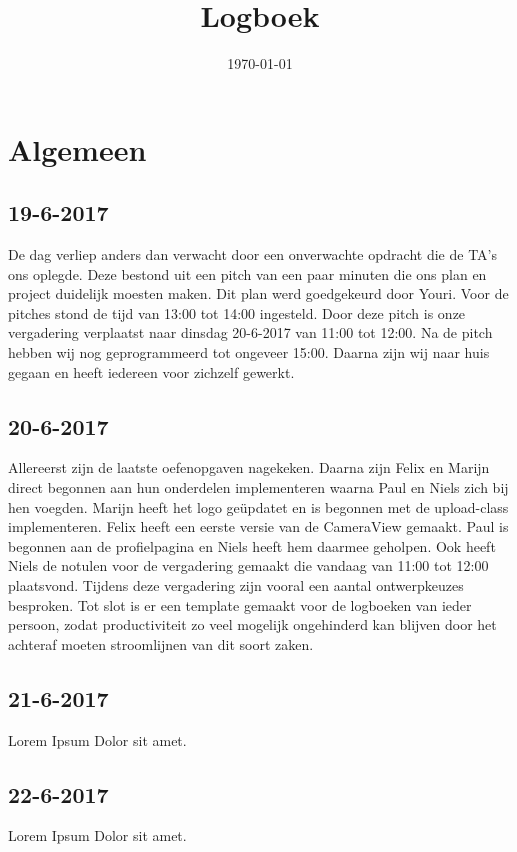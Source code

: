 \documentclass{uva-inf-article}
\title{Logboek}
\date{\today}
\begin{document}
\maketitle

\section{Algemeen}
\subsection{19-6-2017}
De dag verliep anders dan verwacht door een onverwachte opdracht die de TA's ons oplegde. Deze bestond uit een pitch van een paar minuten die ons plan en project 
duidelijk moesten maken. Dit plan werd goedgekeurd door Youri. Voor de pitches stond de tijd van 13:00 tot 14:00 ingesteld. Door deze pitch is onze vergadering verplaatst naar dinsdag 20-6-2017 van 11:00 tot 12:00.
Na de pitch hebben wij nog geprogrammeerd tot ongeveer 15:00. Daarna zijn wij naar huis gegaan en heeft iedereen voor zichzelf gewerkt.
\subsection{20-6-2017}
Allereerst zijn de laatste oefenopgaven nagekeken. Daarna zijn Felix en Marijn direct begonnen aan hun onderdelen implementeren waarna Paul en Niels zich bij hen voegden. Marijn heeft het logo ge\"updatet en is begonnen met de upload-class implementeren. Felix heeft een eerste versie van de CameraView gemaakt.
Paul is begonnen aan de profielpagina en Niels heeft hem daarmee geholpen. Ook heeft Niels de notulen voor de vergadering gemaakt die vandaag van 11:00 tot 12:00 plaatsvond. Tijdens deze vergadering zijn vooral een aantal ontwerpkeuzes besproken. Tot slot is er een template gemaakt voor de logboeken van ieder persoon, zodat productiviteit zo veel mogelijk ongehinderd kan blijven door het achteraf moeten stroomlijnen van dit soort zaken.
\subsection{21-6-2017}
Lorem Ipsum Dolor sit amet.
\subsection{22-6-2017}
Lorem Ipsum Dolor sit amet.
\end{document}
